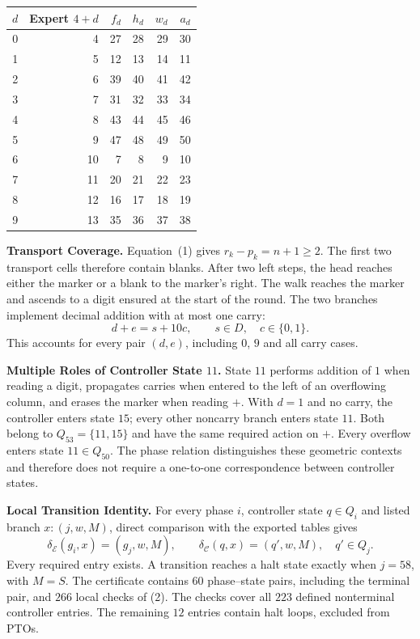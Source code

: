 \documentclass[11pt,a4paper]{article}
\newcommand{\EXPERT}{\mathcal E}
\newcommand{\CTRL}{\mathcal C}
\begin{document}
\begin{center}
\small\renewcommand{\arraystretch}{1.3}\setlength{\tabcolsep}{12pt}
\begin{tabular}{rrrrrr}
\toprule\rowcolor{Pale}$d$ & Expert $4+d$ & $f_d$ & $h_d$ & $w_d$ & $a_d$\\\midrule
0 & 4 & 27 & 28 & 29 & 30 \\
1 & 5 & 12 & 13 & 14 & 11 \\
2 & 6 & 39 & 40 & 41 & 42 \\
3 & 7 & 31 & 32 & 33 & 34 \\
4 & 8 & 43 & 44 & 45 & 46 \\
5 & 9 & 47 & 48 & 49 & 50 \\
6 & 10 & 7 & 8 & 9 & 10 \\
7 & 11 & 20 & 21 & 22 & 23 \\
8 & 12 & 16 & 17 & 18 & 19 \\
9 & 13 & 35 & 36 & 37 & 38 \\
\bottomrule
\end{tabular}
\end{center}

\textbf{Transport Coverage.}
Equation~(1) gives $r_k-p_k=n+1\ge2$. The first two transport cells therefore contain blanks. After two left
steps, the head reaches either the marker or a blank to the marker's right. The walk reaches the
marker and ascends to a digit ensured at the start of the round.
The two branches implement decimal addition with at most one carry:
\[
d+e=s+10c,\qquad s\in D,\quad c\in\{0,1\}.
\]
This accounts for every pair $(d,e)$, including $0$, $9$ and all carry cases.

\textbf{Multiple Roles of Controller State $11$.}
State $11$ performs addition of $1$ when reading a digit, propagates carries when
entered to the left of an overflowing column, and erases the marker when
reading $+$. With $d=1$ and no carry, the controller enters state $15$; every other noncarry branch enters state $11$. Both belong to
$Q_{53}=\{11,15\}$ and have the same required action on $+$.
Every overflow enters state $11\in Q_{50}$.
The phase relation distinguishes these geometric contexts and therefore
does not require a one-to-one correspondence between controller states.

\textbf{Local Transition Identity.}
For every phase $i$, controller state $q\in Q_i$ and listed branch
$x:(j,w,M)$, direct comparison with the exported tables gives
\begin{equation}
\delta_\EXPERT(g_i,x)=(g_j,w,M),\qquad
\delta_\CTRL(q,x)=(q',w,M),\quad q'\in Q_j. \tag{2}
\end{equation}
Every required entry exists. A transition reaches a halt state exactly
when $j=58$, with $M=S$. The certificate contains $60$ phase--state pairs,
including the terminal pair, and $266$ local checks of (2). The checks cover
all $223$ defined nonterminal controller entries. The remaining $12$ entries
contain halt loops, excluded from PTOs.
\end{document}
